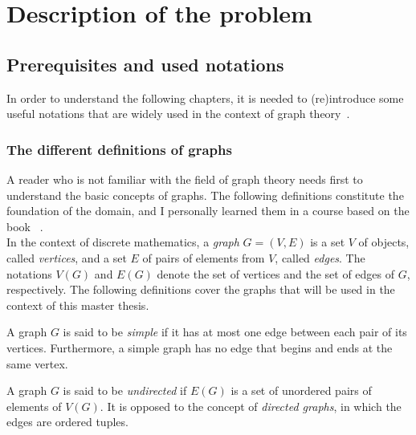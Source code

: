 \setcounter{secnumdepth}{2}

\chapter{Description of the problem}
\label{ch:description-of-the-problem}


\section{Prerequisites and used notations}
\label{sec:prerequisites-and-used-notations}

In order to understand the following chapters, it is needed to (re)introduce some useful notations that are widely used in the context of graph theory~\cite{graphtheory}.


\subsection{The different definitions of graphs}
\label{subsec:the-different-definitions-of-graphs}

A reader who is not familiar with the field of graph theory needs first to understand the basic concepts of graphs.
The following definitions constitute the foundation of the domain, and I personally learned them in a course based on the book ~\cite{graphtheory}.\\

In the context of discrete mathematics, a \textit{graph} $G = (V, E)$ is a set $V$ of objects, called \textit{vertices}, and a set $E$ of pairs of elements from $V$, called \textit{edges}.
The notations $V(G)$ and $E(G)$ denote the set of vertices and the set of edges of $G$, respectively.
The following definitions cover the graphs that will be used in the context of this master thesis.

\begin{definition}
    \label{def:simple_graph}
    A graph $G$ is said to be \textit{simple} if it has at most one edge between each pair of its vertices.
    Furthermore, a simple graph has no edge that begins and ends at the same vertex.
\end{definition}

\begin{definition}
    \label{def:undirected_graph}
    A graph $G$ is said to be \textit{undirected} if $E(G)$ is a set of unordered pairs of elements of $V(G)$.
    It is opposed to the concept of \textit{directed graphs}, in which the edges are ordered tuples.
\end{definition}

